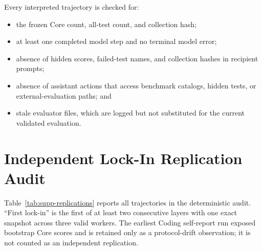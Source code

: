 \documentclass[letterpaper]{article}
\begin{document}
Every interpreted trajectory is checked for:
\begin{itemize}
    \item the frozen Core count, all-test count, and collection hash;
    \item at least one completed model step and no terminal model error;
    \item absence of hidden scores, failed-test names, and collection hashes in
    recipient prompts;
    \item absence of assistant actions that access benchmark catalogs, hidden
    tests, or external-evaluation paths; and
    \item stale evaluator files, which are logged but not substituted for the
    current validated evaluation.
\end{itemize}

\section{Independent Lock-In Replication Audit}

Table~\ref{tab:supp-replications} reports all trajectories in the deterministic
audit. ``First lock-in'' is the first of at least two consecutive layers with
one exact snapshot across three valid workers. The earliest Coding
self-report run exposed bootstrap Core scores and is retained only as a
protocol-drift observation; it is not counted as an independent replication.

\begin{table}[t]
\centering
\caption{Trajectory-level lock-in audit. Terminal score is the three-worker
mean normalized all-test score.}
\label{tab:supp-replications}
\small
{}
\end{table}
\end{document}
